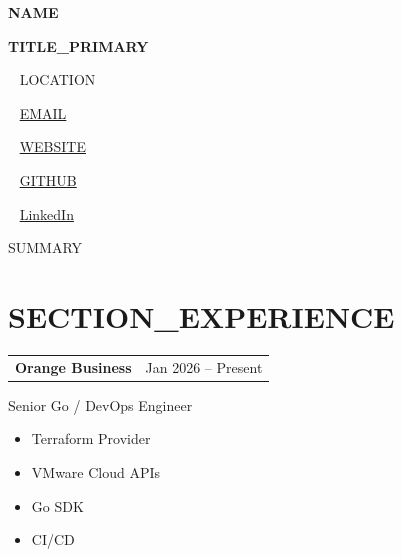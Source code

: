 \documentclass[10pt,a4paper]{article}
\begin{document}

{\fontsize{24}{26}\selectfont\bfseries\color{text}
{{NAME}}
}

\vspace{2pt}

{\Large\color{primary}\textbf{{{TITLE_PRIMARY}}}}

{}

\vspace{8pt}

\small

\faMapMarker*~
{{LOCATION}}
\hspace{12pt}

\faEnvelope~
\href{mailto:{{EMAIL}}}{{EMAIL}}
\hspace{12pt}

\faGlobe~
\href{https://{{WEBSITE}}}{{WEBSITE}}
\hspace{12pt}

\faGithub~
\href{https://github.com/{{GITHUB}}}{{GITHUB}}
\hspace{12pt}

\faLinkedin~
\href{https://{{LINKEDIN}}}{LinkedIn}

\vspace{10pt}


\begin{summary}
\small
{{SUMMARY}}
\end{summary}


\section*{{SECTION_EXPERIENCE}}

\begin{experience}

\begin{tabularx}{\linewidth}{Xr}
\textbf{Orange Business} &
\textcolor{muted}{Jan 2026 -- Present}
\end{tabularx}

\textcolor{primary}{Senior Go / DevOps Engineer}

\vspace{4pt}

\begin{itemize}
\item Terraform Provider
\item VMware Cloud APIs
\item Go SDK
\item CI/CD
\end{itemize}

\end{experience}
\end{document}
